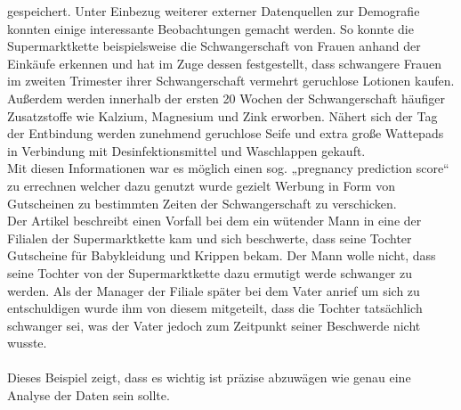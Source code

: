 gespeichert. Unter Einbezug weiterer externer Datenquellen zur Demografie
konnten einige interessante Beobachtungen gemacht werden. So konnte die
Supermarktkette beispielsweise die Schwangerschaft von Frauen anhand der
Einkäufe erkennen und hat im Zuge dessen festgestellt, dass schwangere Frauen
im zweiten Trimester ihrer Schwangerschaft vermehrt geruchlose Lotionen kaufen.
Außerdem werden innerhalb der ersten 20 Wochen der Schwangerschaft häufiger
Zusatzstoffe wie Kalzium, Magnesium und Zink erworben. Nähert sich der Tag der
Entbindung werden zunehmend geruchlose Seife und extra große Wattepads in
Verbindung mit Desinfektionsmittel und Waschlappen gekauft. \\
Mit diesen Informationen war es möglich einen sog. „pregnancy prediction score“
zu errechnen welcher dazu genutzt wurde gezielt Werbung in Form von Gutscheinen
zu bestimmten Zeiten der Schwangerschaft zu verschicken. \\
Der Artikel beschreibt einen Vorfall bei dem ein wütender Mann in eine der
Filialen der Supermarktkette kam und sich beschwerte, dass seine Tochter
Gutscheine für Babykleidung und Krippen bekam. Der Mann wolle nicht, dass seine
Tochter von der Supermarktkette dazu ermutigt werde schwanger zu werden. Als
der Manager der Filiale später bei dem Vater anrief um sich zu entschuldigen
wurde ihm von diesem mitgeteilt, dass die Tochter tatsächlich schwanger sei, was der Vater
jedoch zum Zeitpunkt seiner Beschwerde nicht wusste. \\
\\
Dieses Beispiel zeigt, dass es wichtig ist präzise abzuwägen wie genau eine
Analyse der Daten sein sollte. \\
